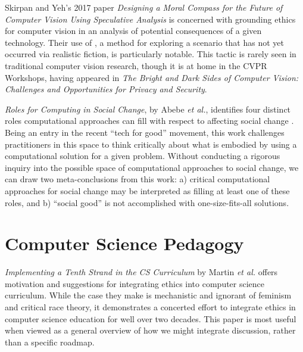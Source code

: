 \documentclass{article}
\newcommand{\etal}{\textit{et al.}}
\begin{document}
    Skirpan and Yeh's 2017 paper \textit{Designing a Moral Compass for the Future of Computer Vision Using Speculative Analysis }\cite{skirpanDesigningMoralCompass2017} is concerned with grounding ethics for computer vision in an analysis of potential consequences of a given technology. Their use of , a method for exploring a scenario that has not yet occurred via realistic fiction, is particularly notable.
    This tactic is rarely seen in traditional computer vision research, though it is at home in the CVPR Workshops, having appeared in \textit{The Bright and Dark Sides of Computer Vision: Challenges and Opportunities for Privacy and Security}.
    
    \textit{Roles for Computing in Social Change}, by Abebe \etal, identifies four distinct roles computational approaches can fill with respect to affecting social change \cite{abebeRolesComputingSocial2019}. Being an entry in the recent ``tech for good'' movement, this work challenges practitioners in this space to think critically about what is embodied by using a computational solution for a given problem. Without conducting a rigorous inquiry into the possible space of computational approaches to social change, we can draw two meta-conclusions from this work: a) critical computational approaches for social change may be interpreted as filling at least one of these roles, and b) ``social good'' is not accomplished with one-size-fits-all solutions.
    
\section{Computer Science Pedagogy}
    
    \textit{Implementing a Tenth Strand in the CS Curriculum} by Martin \etal \cite{martinImplementingTenthStrand1996} offers motivation and suggestions for integrating ethics into computer science curriculum. While the case they make is mechanistic and ignorant of feminism and critical race theory, it demonstrates a concerted effort to integrate ethics in computer science education for well over two decades. This paper is most useful when viewed as a general overview of how we might integrate discussion, rather than a specific roadmap.
    
%
%


\end{document}
